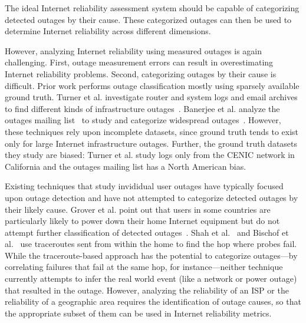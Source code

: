 The ideal Internet reliability assessment system should be capable of
categorizing detected outages by their cause. These categorized
outages can then be used to determine Internet reliability across
different dimensions.

However, analyzing Internet reliability using measured outages is
again challenging. First, outage measurement errors can result in
overestimating Internet reliability problems. Second, categorizing
outages by their cause is difficult. Prior work performs
outage classification mostly using sparsely available ground
truth. Turner et al. investigate router and system logs and email
archives to find different kinds of infrastructure
outages~\cite{california-fault-lines}. Banerjee et al. analyze the
outages mailing list~\cite{outages-mailing-list} to study and
categorize widespread
outages~\cite{phillipa-outages-mailing-list}. However, these
techniques rely upon incomplete datasets, since ground truth tends to
exist only for large Internet infrastructure outages. Further, the
ground truth datasets they study are biased: Turner et al. study logs only
from the CENIC network in California and the outages mailing list has
a North American bias. 

Existing techniques that study invididual user
outages have typically focused upon outage detection and have not
attempted to categorize detected outages by their likely cause. Grover
et al. point out that users in some countries are particularly likely
to power down their home Internet equipment but do not attempt further
classification of detected outages~\cite{grover2013peeking}. Shah et
al.~\cite{disco} and Bischof et al.~\cite{alwayson} use traceroutes sent from within the
home to find the hop where probes fail. While the traceroute-based
approach has the potential to categorize outages---by correlating
failures that fail at the same hop, for instance---neither technique currently
attempts to infer the real world event (like a network or power
outage) that resulted in the outage. However, analyzing the reliability of an
ISP or the reliability of a geographic area requires the
identification of outage causes, so that the appropriate subset of
them can be used in Internet reliability metrics. 




